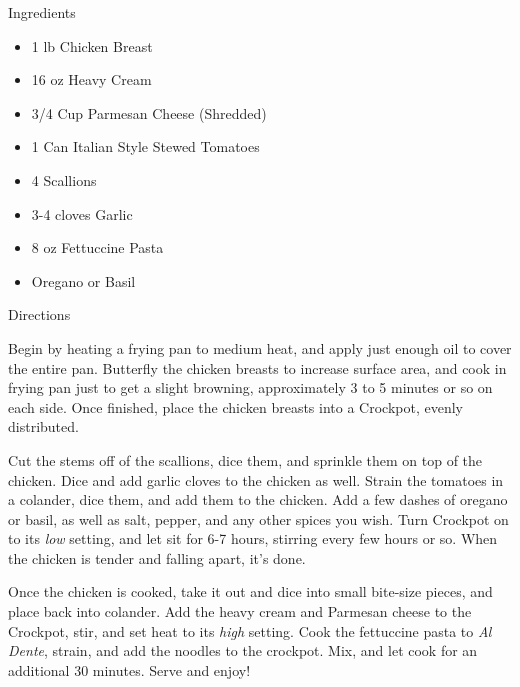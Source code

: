 Ingredients

\begin{itemize}
	\item 1 lb Chicken Breast
	\item 16 oz Heavy Cream
	\item 3/4 Cup Parmesan Cheese (Shredded)
	\item 1 Can Italian Style Stewed Tomatoes
	\item 4 Scallions
	\item 3-4 cloves Garlic
	\item 8 oz Fettuccine Pasta
	\item Oregano or Basil
\end{itemize}

\noindent
Directions
\newline

Begin by heating a frying pan to medium heat, and apply just enough oil to cover the entire pan. Butterfly the chicken breasts to increase surface area, and cook in frying pan just to get a slight browning, approximately 3 to 5 minutes or so on each side. Once finished, place the chicken breasts into a Crockpot, evenly distributed.

Cut the stems off of the scallions, dice them, and sprinkle them on top of the chicken. Dice and add garlic cloves to the chicken as well. Strain the tomatoes in a colander, dice them, and add them to the chicken. Add a few dashes of oregano or basil, as well as salt, pepper, and any other spices you wish. Turn Crockpot on to its \textit{low} setting, and let sit for 6-7 hours, stirring every few hours or so. When the chicken is tender and falling apart, it's done.

Once the chicken is cooked, take it out and dice into small bite-size pieces, and place back into colander. Add the heavy cream and Parmesan cheese to the Crockpot, stir, and set heat to its \textit{high} setting. Cook the fettuccine pasta to \textit{Al Dente}, strain, and add the noodles to the crockpot. Mix, and let cook for an additional 30 minutes. Serve and enjoy!